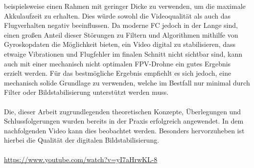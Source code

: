 beispielsweise einen Rahmen mit geringer Dicke zu verwenden, um die maximale Akkulaufzeit zu erhalten.
Dies würde sowohl die Videoqualität als auch das Flugverhalten negativ beeinflussen. Da moderne FC
jedoch in der Lange sind, einen großen Anteil dieser Störungen zu Filtern und Algorithmen mithilfe
von Gyroskopdaten die Möglichkeit bieten, ein Video digital zu stabilisieren, dass etwaige Vibrationen
und Flugfehler im finalen Schnitt nicht sichtbar sind, kann auch mit einer mechanisch nicht optimalen
FPV-Drohne ein gutes Ergebnis erzielt werden. Für das bestmögliche Ergebnis empfiehlt es sich jedoch,
eine mechanisch solide Grundlage zu verwenden, welche im Bestfall nur minimal durch Filter oder 
Bildstabilisierung unterstützt werden muss. \\
\\
Die, dieser Arbeit zugrundlegenden theoretischen Konzepte, Überlegungen und Schlussfolgerungen
wurden bereits in der Praxis erfolgreich angewendet. In dem nachfolgenden Video kann dies beobachtet
werden. Besonders hervorzuheben ist hierbei die Qualität der digitalen Bildstabilisierung. \\
\\
\href{https://www.youtube.com/watch?v=yI7aHrwKL-8}{https://www.youtube.com/watch?v=yI7aHrwKL-8}
